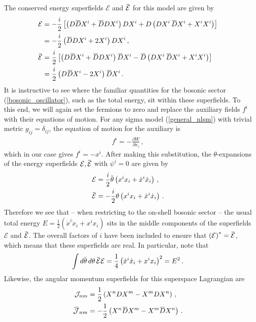 \documentclass[12pt]{article}
\numberwithin{equation}{section}
\newcommand{\overbar}[1]{\mkern 1.5mu\overline{\mkern-1.5mu#1\mkern-1.5mu}\mkern 1.5mu}
\newcommand{\Dbar}{\overbar{D}}
\newcommand{\thetab}{\overbar{\theta}}
\def\cEb{{\overbar{\mathcal{E}}}}
\def\cE{{\mathcal{E}}}
\begin{document}
The conserved energy superfields $\cE$ and $\cEb$ for this model are given by
%
\begin{align}
    \cE &= - \frac{i}{2} \left[ \left( D \Dbar X^i + \Dbar D X^i \right) D X^i + D \left( D X^i \, \Dbar X^i  + X^i X^i \right) \right] \nonumber \\
    &= - \frac{i}{2} \left( \Dbar D X^i + 2 X^i \right) D X^i  \, , \nonumber \\
    \cEb &= \frac{i}{2} \left[ \left( D \Dbar X^i + \Dbar D X^i \right) \Dbar X^i - \Dbar \left( D X^i \, \Dbar X^i + X^i X^i \right) \right] \nonumber \\
    &= \frac{i}{2} \left( D \Dbar X^i - 2 X^i \right) \Dbar X^i \, .
\end{align}
%
It is instructive to see where the familiar quantities for the bosonic sector (\ref{bosonic_oscillator}), such as the total energy, sit within these superfields. To this end, we will again set the fermions to zero and replace the auxiliary fields $f^i$ with their equations of motion. For any sigma model (\ref{general_nlsm}) with trivial metric $g_{ij} = \delta_{ij}$, the equation of motion for the auxiliary is
%
\begin{align}
    f^i = - \frac{\partial W}{\partial x_i} \, , 
\end{align}
%
which in our case gives $f^i = - x^i$. After making this substitution, the $\theta$-expansions of the energy superfields $\cE, \cEb$ with $\psi^i = 0$ are given by
%
\begin{align}\label{susy_oscillator_energies}
    \cE &= \frac{i}{2} \thetab \left( x^i x_i + \dot{x}^i \dot{x}_i \right) \, , \nonumber \\
    \cEb &= - \frac{i}{2} \theta \left( x^i x_i + \dot{x}^i \dot{x}_i \right) \, .
\end{align}
%
Therefore we see that -- when restricting to the on-shell bosonic sector -- the usual total energy $E = \frac{1}{2} \left( \dot{x}^i \dot{x}_i + x^i x_i \right)$ sits in the middle components of the superfields $\cE$ and $\cEb$. The overall factors of $i$ have been included to ensure that $\left( \cE \right)^\ast = \cEb$, which means that these superfields are real. In particular, note that
%
\begin{align}\label{EE_int}
    \int d \thetab \, d \theta \, \cEb \cE = \frac{1}{4} \left( \dot{x}^i \dot{x}_i + x^i x_i \right)^2 = E^2 \, .
\end{align}
%
Likewise, the angular momentum superfields for this superspace Lagrangian are
%
\begin{align}\label{susy_oscillator_Js}
    \mathcal{J}_{nm} &= \frac{1}{2} \left( X^n D X^m - X^m D X^n \right) \, , \nonumber \\
    \overbar{\mathcal{J}}_{nm} &= - \frac{1}{2} \left( X^n \Dbar X^m - X^m \Dbar X^n \right) \, .
\end{align}
\end{document}
